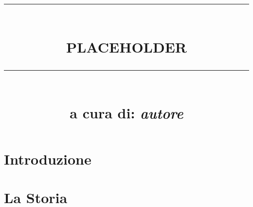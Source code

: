 \documentclass[a4paper, oneside, 12pt]{book}
\newcommand\setitle{\bfseries{PLACEHOLDER}} %
\newcommand\seauthor{autore} %
\newcommand{\HRule}[1]{\rule{\linewidth}{#1}}
\begin{document}
	
	\title{{}
			\\ [1.0cm]
			\HRule{2pt}\\
			\Large{\setitle}
			\HRule{2pt}
			\\[0.5cm]
			\normalsize{a cura di: \emph{\seauthor}}}
	\date{}
	\author{}
	
	\maketitle
	
	
	
	\frontmatter
		\tableofcontents
		
		\part{Introduzione}
			
			
		
	\mainmatter
		\part{La Storia}
			
\end{document}
